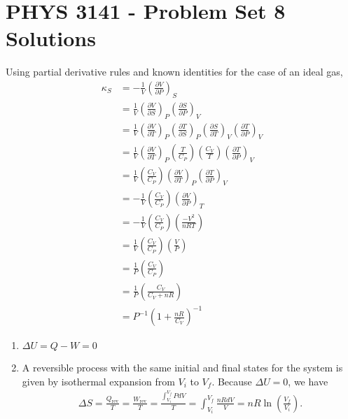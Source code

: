 \documentclass[a4paper,12pt]{article}
\begin{document}
\section*{PHYS 3141 - Problem Set 8 Solutions}

\begin{enumerate}[label=\textbf{[\arabic*]}]
    \item
        Using partial derivative rules and known identities for the case of an ideal gas,
        \begin{align*}
            \kappa_S &= -\frac{1}{V} \left( \frac{\partial V}{\partial P} \right)_S \\
            &= \frac{1}{V} \left( \frac{\partial V}{\partial S} \right)_P \left( \frac{\partial S}{\partial P} \right)_V \\
            &= \frac{1}{V} \left( \frac{\partial V}{\partial T} \right)_P \left( \frac{\partial T}{\partial S} \right)_P \left( \frac{\partial S}{\partial T} \right)_V \left( \frac{\partial T}{\partial P} \right)_V\\
            &= \frac{1}{V} \left( \frac{\partial V}{\partial T} \right)_P \left( \frac{T}{C_P} \right) \left( \frac{C_V}{T} \right) \left( \frac{\partial T}{\partial P} \right)_V \\
            &= \frac{1}{V} \left( \frac{C_V}{C_P} \right) \left( \frac{\partial V}{\partial T} \right)_P \left( \frac{\partial T}{\partial P} \right)_V \\
            &= -\frac{1}{V} \left( \frac{C_V}{C_P} \right) \left( \frac{\partial V}{\partial P} \right)_T \\
            &= -\frac{1}{V} \left( \frac{C_V}{C_P} \right) \left( \frac{-V^2}{nRT} \right) \\
            &= \frac{1}{V} \left( \frac{C_V}{C_P} \right) \left( \frac{V}{P} \right) \\
            &= \frac{1}{P} \left( \frac{C_V}{C_P} \right) \\
            &= \frac{1}{P} \left( \frac{C_V}{C_V + nR} \right) \\
            &= P^{-1} \left( 1 + \frac{nR}{C_V} \right)^{-1}
        \end{align*}

    \item
        \begin{enumerate}
            \item
                $\Delta U = Q - W = 0$

            \item
                A reversible process with the same initial and final states for the system is given by isothermal expansion from $V_i$ to $V_f$. Because $\Delta U = 0$, we have
                \begin{align*}
                    \Delta S = \frac{Q_\text{rev}}{T} = \frac{W_\text{rev}}{T} = \frac{\int_{V_i}^{V_f} P dV}{T} = \int_{V_i}^{V_f} \frac{nRdV}{V} = nR \ln\left( \frac{V_f}{V_i} \right).
                \end{align*}


\end{enumerate}
\end{enumerate}
\end{document}
